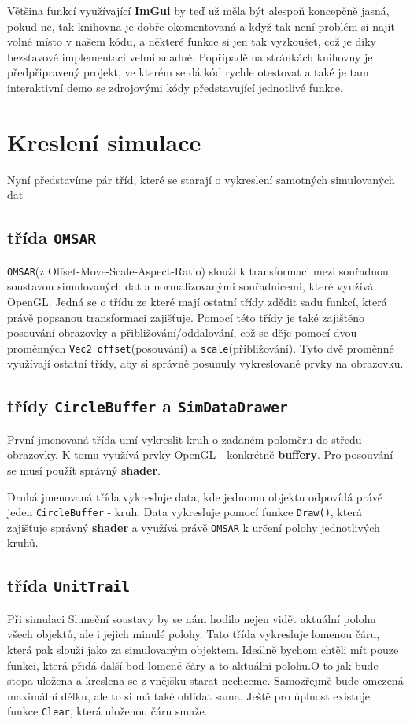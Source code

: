 Většina funkcí využívající \textbf{ImGui} by teď už měla být alespoň koncepčně jasná, pokud ne, tak knihovna je dobře okomentovaná a když tak není problém si najít volné místo v našem kódu, a některé funkce si jen tak vyzkoušet, což je díky bezstavové implementaci velmi snadné. Popřípadě na stránkách knihovny je předpřipravený projekt, ve kterém se dá kód rychle otestovat a také je tam interaktivní demo se zdrojovými kódy představující jednotlivé funkce.
\section{Kreslení simulace}
Nyní představíme pár tříd, které se starají o vykreslení samotných simulovaných dat
\subsection{třída \texttt{OMSAR}}
\texttt{OMSAR}(z Offset-Move-Scale-Aspect-Ratio) slouží k transformaci mezi souřadnou soustavou simulovaných dat a normalizovanými souřadnicemi, které využívá OpenGL. Jedná se o třídu ze které mají ostatní třídy zdědit sadu funkcí, která právě popsanou transformaci zajišťuje. Pomocí této třídy je také zajištěno posouvání obrazovky a přibližování/oddalování, což se děje pomocí dvou proměnných \texttt{Vec2 offset}(posouvání) a \texttt{scale}(přibližování). Tyto dvě proměnné využívají ostatní třídy, aby si správně posunuly vykreslované prvky na obrazovku.
\subsection{třídy \texttt{CircleBuffer} a \texttt{SimDataDrawer}} 
První jmenovaná třída umí vykreslit kruh o zadaném poloměru do středu obrazovky. K tomu využívá prvky OpenGL - konkrétně \textbf{buffery}. Pro posouvání se musí použít správný \textbf{shader}.
 
Druhá jmenovaná třída vykresluje data, kde jednomu objektu odpovídá právě jeden \texttt{CircleBuffer} - kruh. Data vykresluje pomocí funkce \texttt{Draw()}, která zajišťuje správný \textbf{shader} a využívá právě \texttt{OMSAR} k určení polohy jednotlivých kruhů.
\subsection{třída \texttt{UnitTrail}}
\label{sec:unitTrail}
Při simulaci Sluneční soustavy by se nám hodilo nejen vidět aktuální polohu všech objektů, ale i jejich minulé polohy. Tato třída vykresluje lomenou čáru, která pak slouží jako  za simulovaným objektem. Ideálně bychom chtěli mít pouze funkci, která přidá další bod lomené čáry a to aktuální polohu.O to jak bude stopa uložena a kreslena se z vnějšku starat nechceme. Samozřejmě bude omezená maximální délku, ale to si má také ohlídat sama. Ještě pro úplnost existuje funkce \texttt{Clear}, která uloženou čáru smaže.

